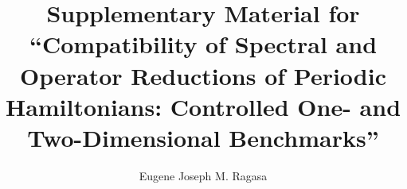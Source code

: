 \documentclass[preprint,12pt]{elsarticle}
\begin{document}
\begin{frontmatter}

\title{Supplementary Material for ``Compatibility of Spectral and Operator
Reductions of Periodic Hamiltonians: Controlled One- and Two-Dimensional
Benchmarks''}

\author[dlsu]{Eugene Joseph M. Ragasa}

\address[dlsu]{Department of Physics, De La Salle University,
Manila, Philippines}

\end{frontmatter}


\clearpage

\clearpage

\clearpage

\clearpage




\end{document}
